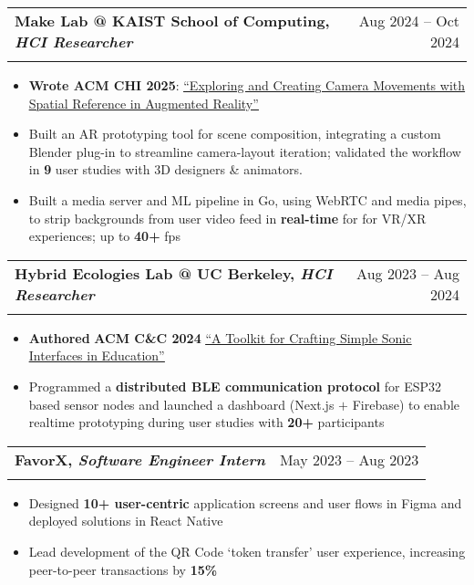 \documentclass[letterpaper,11pt]{article}
\makeatletter
\newcommand{\resumeItem}[1]{
  \item\small{
    {#1 \vspace{2pt}}
  }
}
\newcommand{\resumeSubheading}[4]{
  \vspace{-1pt}\item
    \begin{tabular*}{0.97\textwidth}[t]{l@{\extracolsep{\fill}}r}
      \textbf{#1} & #2 \\
      \textit{\small#3} & \textit{\small #4} \\
    \end{tabular*}\vspace{-5pt}
}
\newcommand{\resumeSubSubheading}[2]{
    \item
    \begin{tabular*}{0.97\textwidth}{l@{\extracolsep{\fill}}r}
      \textit{\small#1} & \textit{\small #2} \\
    \end{tabular*}\vspace{-5pt}
}
\newcommand{\resumeItemListStart}{\begin{itemize}}
\newcommand{\resumeItemListEnd}{\end{itemize}\vspace{-5pt}}
\makeatother
\begin{document}
    \resumeSubheading
      {Make Lab @ KAIST School of Computing, \textnormal{\emph{HCI Researcher}}}{Aug 2024 -- Oct 2024}
      {}{}
      \vspace{-15pt}
      \resumeItemListStart
        \resumeItem{\textbf{Wrote ACM CHI 2025}: \underline{\href{https://dl.acm.org/doi/10.1145/3706599.3721180}{``Exploring and Creating Camera Movements with Spatial Reference in Augmented Reality''}}}
        \resumeItem{Built an AR prototyping tool for scene composition, integrating a custom Blender plug-in to streamline camera-layout iteration; validated the workflow in \textbf{9} user studies with 3D designers \& animators.}
        \resumeItem{Built a media server and ML pipeline in Go, using WebRTC and media pipes, to strip backgrounds from user video feed in \textbf{real-time} for for VR/XR experiences; up to \textbf{40+} fps}
      \resumeItemListEnd

    \resumeSubheading
      {Hybrid Ecologies Lab @ UC Berkeley, \textnormal{\emph{HCI Researcher}}}{Aug 2023 -- Aug 2024}
      {}{}
      \vspace{-15pt}
      \resumeItemListStart
      \resumeItem{\textbf{Authored} \textbf{ACM C\&C 2024} \underline{\href{https://dl.acm.org/doi/10.1145/3635636.3664266}{``A Toolkit for Crafting Simple Sonic Interfaces in Education''}}}
      \resumeItem{Programmed a \textbf{distributed BLE communication protocol} for ESP32 based sensor nodes and launched a dashboard (Next.js $+$ Firebase) to enable realtime prototyping during user studies with \textbf{20+} participants}
    \resumeItemListEnd


    \resumeSubheading
      {FavorX, \textnormal{\emph{Software Engineer Intern}}}{May 2023 -- Aug 2023}
      {}{}
      \vspace{-15pt}
      \resumeItemListStart
      \resumeItem{Designed \textbf{10+ user-centric} application screens and user flows in Figma and deployed solutions in React Native}
      \resumeItem{Lead development of the QR Code `token transfer' user experience, increasing peer-to-peer transactions by \textbf{15\%}}  
      \resumeItemListEnd
\end{document}
